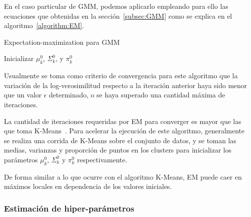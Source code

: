 En el caso particular de GMM, podemos aplicarlo empleando para ello las ecuaciones que obtenidas en la sección~\ref{subsec:GMM} como se explica en el algoritmo~\ref{algorithm:EM}.

\begin{algorithm}
    \caption{Expectation-maximization para GMM}
    \label{algorithm:EM}
    Inicializar $\mu_k^0$, $\Sigma_k^0$, y $\pi_k^0$\;
\end{algorithm}

Usualmente se toma como criterio de convergencia para este algoritmo que la variación de la log-verosimilitud respecto a la iteración anterior haya sido menor que un valor $\epsilon$ determinado, o se haya superado una cantidad máxima de iteraciones.

La cantidad de iteraciones requeridas por EM para converger es mayor que las que toma K-Means~\cite{Park09}.
Para acelerar la ejecución de este algoritmo, generalmente se realiza una corrida de K-Means sobre el conjunto de datos, y se toman las medias, varianzas y proporción de puntos en los clusters para inicializar los parámetros $\mu_k^0$, $\Sigma_k^0$ y $\pi_k^0$ respectivamente.

De forma similar a lo que ocurre con el algoritmo K-Means, EM puede caer en máximos locales en dependencia de los valores iniciales.

\subsubsection{Estimación de hiper-parámetros}

